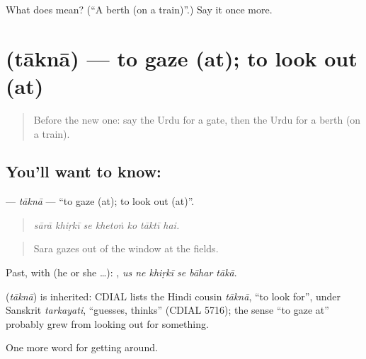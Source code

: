\begin{tcolorbox}[breakable,colback=teal!4,colframe=teal!35!black,title={Before you move on}]
What does  mean? (\textquotedblleft{}A berth (on a train)\textquotedblright{}.) Say it once more.
\end{tcolorbox}
\section[\texorpdfstring{\ur{تاکنا} (tāknā)}{تاکنا (tāknā)}]{ (tāknā) — to gaze (at); to look out (at)}

\label{lesson:UR-C388-takna}



\begin{quote}
Before the new one: say the Urdu for a gate, then the Urdu for a berth (on a train).
\end{quote}

\subsection*{You'll want to know: }
\textbf{} — \emph{tāknā} — \textquotedblleft{}to gaze (at); to look out (at)\textquotedblright{}.

\begin{quote}
      
\end{quote}

\begin{quote}
\emph{sārā khiṛkī se khetoṅ ko tāktī hai.}
\end{quote}

\begin{quote}
Sara gazes out of the window at the fields.
\end{quote}

Past, with  (he or she …):      , \emph{us ne khiṛkī se bāhar tākā}.

\begin{cousinweb}
\textbf{} (\emph{tāknā}) is inherited: CDIAL lists the Hindi cousin \emph{tāknā}, \textquotedblleft{}to look for\textquotedblright{}, under Sanskrit \emph{tarkayati}, \textquotedblleft{}guesses, thinks\textquotedblright{} (CDIAL 5716); the sense \textquotedblleft{}to gaze at\textquotedblright{} probably grew from looking out for something.
\end{cousinweb}

\begin{grammarlens}[title={What you've built}]
One more word for getting around.
\end{grammarlens}

